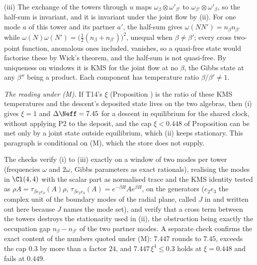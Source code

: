 (iii) The exchange of the towers through $u$ maps $\omega_{\beta} \otimes \omega'_{\beta'}$ to $\omega_{\beta'} \otimes \omega'_{\beta}$, so the half-sum is invariant, and it is invariant under the joint flow by (ii). For one mode $a$ of this tower and its partner $a'$, the half-sum gives $\omega(N N') = n_{\beta}n_{\beta'}$ while $\omega(N)\omega(N') = \bigl(\tfrac12(n_{\beta} + n_{\beta'})\bigr)^{2}$, unequal when $\beta \neq \beta'$; every cross two-point function, anomalous ones included, vanishes, so a quasi-free state would factorise these by Wick's theorem, and the half-sum is not quasi-free. By uniqueness on windows it is KMS for the joint flow at no $\beta$, the Gibbs state at any $\beta''$ being a product. Each component has temperature ratio $\beta/\beta' \neq 1$.

\emph{The reading under (M).} If T14's $\xi$ (Proposition ) is the ratio of these KMS temperatures and the descent's deposited state lives on the two algebras, then (i) gives $\xi = 1$ and $\Delta\Neff = 7.45$ for a descent in equilibrium for the shared clock, without applying P2 to the deposit, and the cap $\xi < 0.448$ of Proposition  can be met only by a joint state outside equilibrium, which (ii) keeps stationary. This paragraph is conditional on (M), which the store does not supply.

The checks verify (i) to (iii) exactly on a window of two modes per tower (frequencies $\omega$ and $2\omega$, Gibbs parameters as exact rationals), realising the modes in $\Cl(4,4)$ with the scalar part as normalised trace and the KMS identity tested as $\rho A = \tau_{\beta e_{2}e_{3}}(A)\rho$, $\tau_{\beta e_{2}e_{3}}(A) = e^{-\beta H}Ae^{\beta H}$, on the generators ($e_{2}e_{3}$ the complex unit of the boundary modes of the radial plane, called $J$ in  and written out here because $J$ names the mode set), and verify that a cross term between the towers destroys the stationarity used in (ii), the obstruction being exactly the occupation gap $n_{\beta} - n_{\beta'}$ of the two partner modes. A separate check confirms the exact content of the numbers quoted under (M): $7.447$ rounds to $7.45$, exceeds the cap $0.3$ by more than a factor $24$, and $7.447\,\xi^{4} \le 0.3$ holds at $\xi = 0.448$ and fails at $0.449$.
